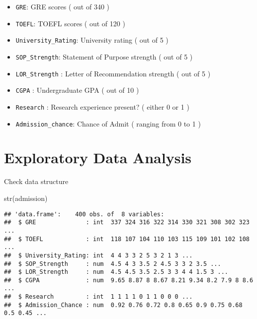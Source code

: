 \documentclass[
  ignorenonframetext,
]{beamer}
\newenvironment{Shaded}{\begin{snugshade}}{\end{snugshade}}
\newcommand{\FunctionTok}[1]{\textcolor[rgb]{0.00,0.00,0.00}{#1}}
\newcommand{\NormalTok}[1]{#1}
\providecommand{\tightlist}{%
  \setlength{\itemsep}{0pt}\setlength{\parskip}{0pt}}
\begin{document}
\begin{frame}[fragile]
\begin{itemize}
\tightlist
\item
  \texttt{GRE}: GRE scores ( out of 340 )
\item
  \texttt{TOEFL}: TOEFL scores ( out of 120 )
\item
  \texttt{University\_Rating}: University rating ( out of 5 )
\item
  \texttt{SOP\_Strength}: Statement of Purpose strength ( out of 5 )
\item
  \texttt{LOR\_Strength} : Letter of Recommendation strength ( out of 5
  )
\item
  \texttt{CGPA} : Undergraduate GPA ( out of 10 )
\item
  \texttt{Research} : Research experience present? ( either 0 or 1 )
\item
  \texttt{Admission\_chance}: Chance of Admit ( ranging from 0 to 1 )
\end{itemize}
\end{frame}

\hypertarget{exploratory-data-analysis}{%
\section{Exploratory Data Analysis}\label{exploratory-data-analysis}}

\begin{frame}[fragile]{Check data structure}
\protect\hypertarget{check-data-structure}{}
\begin{Shaded}
\begin{Highlighting}[]
\FunctionTok{str}\NormalTok{(admission)}
\end{Highlighting}
\end{Shaded}

\begin{verbatim}
## 'data.frame':    400 obs. of  8 variables:
##  $ GRE              : int  337 324 316 322 314 330 321 308 302 323 ...
##  $ TOEFL            : int  118 107 104 110 103 115 109 101 102 108 ...
##  $ University_Rating: int  4 4 3 3 2 5 3 2 1 3 ...
##  $ SOP_Strength     : num  4.5 4 3 3.5 2 4.5 3 3 2 3.5 ...
##  $ LOR_Strength     : num  4.5 4.5 3.5 2.5 3 3 4 4 1.5 3 ...
##  $ CGPA             : num  9.65 8.87 8 8.67 8.21 9.34 8.2 7.9 8 8.6 ...
##  $ Research         : int  1 1 1 1 0 1 1 0 0 0 ...
##  $ Admission_Chance : num  0.92 0.76 0.72 0.8 0.65 0.9 0.75 0.68 0.5 0.45 ...
\end{verbatim}
\end{frame}
\end{document}
